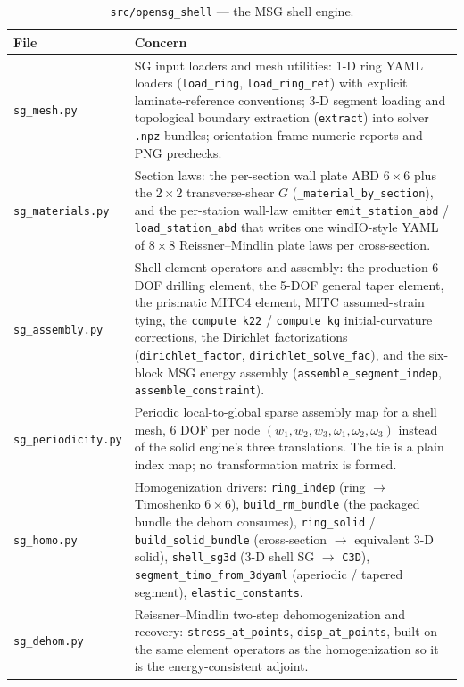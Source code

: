 \begin{table}[htbp]
\centering
\caption{\texttt{src/opensg\_shell} --- the MSG shell engine.}
\label{tab:mod-shell}
\small
\begin{tabular}{@{}lp{9.1cm}@{}}
\toprule
File & Concern \\
\midrule
\texttt{sg\_mesh.py} &
SG input loaders and mesh utilities: 1-D ring YAML loaders
(\texttt{load\_ring}, \texttt{load\_ring\_ref}) with explicit laminate-reference
conventions; 3-D segment loading and topological boundary extraction
(\texttt{extract}) into solver \texttt{.npz} bundles; orientation-frame numeric
reports and PNG prechecks. \\
\texttt{sg\_materials.py} &
Section laws: the per-section wall plate ABD $6\times6$ plus the $2\times2$
transverse-shear $G$ (\texttt{\_material\_by\_section}), and the per-station
wall-law emitter \texttt{emit\_station\_abd} / \texttt{load\_station\_abd} that
writes one windIO-style YAML of $8\times8$ Reissner--Mindlin plate laws per
cross-section. \\
\texttt{sg\_assembly.py} &
Shell element operators and assembly: the production 6-DOF drilling element, the
5-DOF general taper element, the prismatic MITC4 element, MITC assumed-strain
tying, the \texttt{compute\_k22} / \texttt{compute\_kg} initial-curvature
corrections, the Dirichlet factorizations
(\texttt{dirichlet\_factor}, \texttt{dirichlet\_solve\_fac}), and the six-block
MSG energy assembly (\texttt{assemble\_segment\_indep},
\texttt{assemble\_constraint}). \\
\texttt{sg\_periodicity.py} &
Periodic local-to-global sparse assembly map for a shell mesh, $6$ DOF per node
$(w_1,w_2,w_3,\omega_1,\omega_2,\omega_3)$ instead of the solid engine's three
translations. The tie is a plain index map; no transformation matrix is formed. \\
\texttt{sg\_homo.py} &
Homogenization drivers: \texttt{ring\_indep} (ring $\rightarrow$ Timoshenko
$6\times6$), \texttt{build\_rm\_bundle} (the packaged bundle the dehom
consumes), \texttt{ring\_solid} / \texttt{build\_solid\_bundle}
(cross-section $\rightarrow$ equivalent 3-D solid), \texttt{shell\_sg3d} (3-D
shell SG $\rightarrow$ \texttt{C3D}), \texttt{segment\_timo\_from\_3dyaml}
(aperiodic / tapered segment), \texttt{elastic\_constants}. \\
\texttt{sg\_dehom.py} &
Reissner--Mindlin two-step dehomogenization and recovery:
\texttt{stress\_at\_points}, \texttt{disp\_at\_points}, built on the same
element operators as the homogenization so it is the energy-consistent adjoint. \\

\end{tabular}
\end{table}
